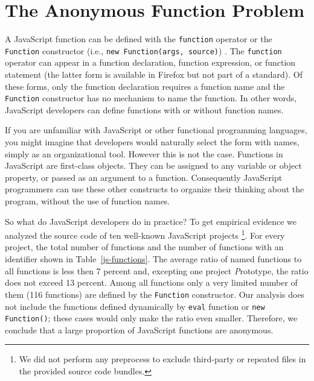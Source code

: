 \documentclass[10pt, preprint]{sigplanconf}
\begin{document}
\section{The Anonymous Function Problem}

A JavaScript function can be defined with the {\small\texttt{function}} operator or the {\small\texttt{Function}} constructor (i.e., {\small\texttt{new Function(args, source)}}) \cite{ECMA}. The {\small\texttt{function}} operator can appear in a function declaration, function expression, or function statement (the latter form is available in Firefox but not part of a standard).  Of these forms, only the function declaration requires a function name and the {\small\texttt{Function}} constructor has no mechanism to name the function.  In other words, JavaScript developers can define functions with or without function names.

If you are unfamiliar with JavaScript or other functional programming languages, you might imagine that developers would naturally select the form with names, simply as an organizational tool. However this is not the case. Functions in JavaScript are first-class objects. They can be assigned to any variable or object property, or passed as an argument to a function. Consequently JavaScript programmers can use these other constructs to organize their thinking about the program, without the use of function names.

So what do JavaScript developers do in practice?  To get empirical evidence we analyzed the source code of ten well-known JavaScript projects \footnote[1]{We did not perform any preprocess to exclude third-party or repeated files in the provided source code bundles.}. For every project, the total number of functions and the number of functions with an identifier shown in Table~\ref{js-functions}. The average ratio of named functions to all functions is less then 7 percent and, excepting one project {\textit Prototype}, the ratio does not exceed 13 percent. Among all functions only a very limited number of them (116 functions) are defined by the {\small\texttt{Function}} constructor. Our analysis does not include the functions defined dynamically by {\small\texttt{eval}} function or {\small\texttt{new Function()}}; these cases would only make the ratio even smaller.  Therefore, we conclude that a large proportion of JavaScript functions are anonymous.
\end{document}
